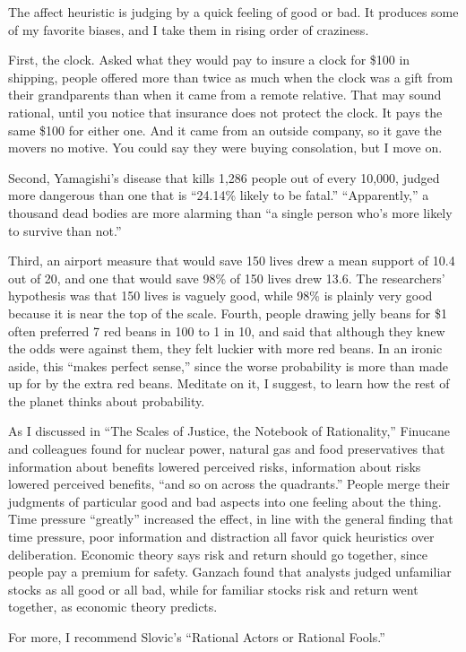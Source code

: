 
The affect heuristic is judging by a quick feeling of good or bad. It produces some of my favorite biases, and I take them in rising order of craziness.

First, the clock. Asked what they would pay to insure a clock for \$100 in shipping, people offered more than twice as much when the clock was a gift from their grandparents than when it came from a remote relative. That may sound rational, until you notice that insurance does not protect the clock. It pays the same \$100 for either one. And it came from an outside company, so it gave the movers no motive. You could say they were buying consolation, but I move on. 

Second, Yamagishi's disease that kills 1,286 people out of every 10,000, judged more dangerous than one that is ``24.14\% likely to be fatal.'' ``Apparently,'' a thousand dead bodies are more alarming than ``a single person who's more likely to survive than not.'' 

Third, an airport measure that would save 150 lives drew a mean support of 10.4 out of 20, and one that would save 98\% of 150 lives drew 13.6. The researchers' hypothesis was that 150 lives is vaguely good, while 98\% is plainly very good because it is near the top of the scale. Fourth, people drawing jelly beans for \$1 often preferred 7 red beans in 100 to 1 in 10, and said that although they knew the odds were against them, they felt luckier with more red beans. In an ironic aside, this ``makes perfect sense,'' since the worse probability is more than made up for by the extra red beans. Meditate on it, I suggest, to learn how the rest of the planet thinks about probability.

As I discussed in ``The Scales of Justice, the Notebook of Rationality,'' Finucane and colleagues found for nuclear power, natural gas and food preservatives that information about benefits lowered perceived risks, information about risks lowered perceived benefits, ``and so on across the quadrants.'' People merge their judgments of particular good and bad aspects into one feeling about the thing. Time pressure ``greatly'' increased the effect, in line with the general finding that time pressure, poor information and distraction all favor quick heuristics over deliberation.  Economic theory says risk and return should go together, since people pay a premium for safety. Ganzach found that analysts judged unfamiliar stocks as all good or all bad, while for familiar stocks risk and return went together, as economic theory predicts.

For more, I recommend Slovic's ``Rational Actors or Rational Fools.'' 
